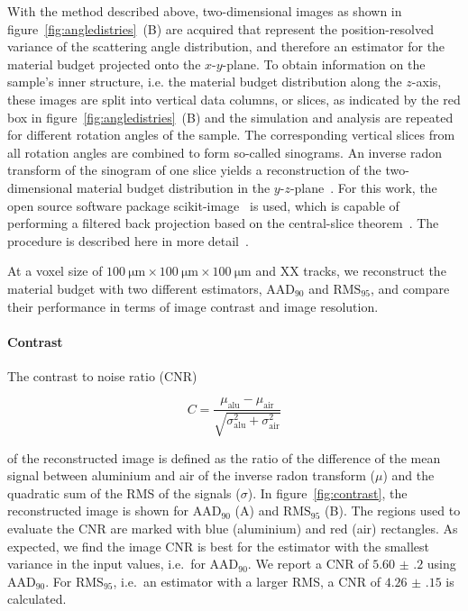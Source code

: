 \documentclass{PoS}
\newcommand{\rmsninetyfive}{\ensuremath{\textrm{RMS}_\textrm{95}}}
\newcommand{\aadninety}{\ensuremath{\textrm{AAD}_\textrm{90}}}
\begin{document}
With the method described above, two-dimensional images as shown in  figure~\ref{fig:angledistries}~(B) are acquired that represent the position-resolved variance of the scattering angle distribution,
 and therefore an estimator for the material budget projected onto the $x$-$y$-plane. 
To obtain information on the sample's inner structure, i.e. the material budget distribution along the $z$-axis, these images are split into vertical data columns, or slices,
as indicated by the red box in figure~\ref{fig:angledistries}~(B) and
 the simulation and analysis are repeated for different rotation angles of the sample.
  The corresponding vertical slices from all rotation angles are combined to form so-called sinograms.
An inverse radon transform of the sinogram of one slice yields a reconstruction of the two-dimensional material budget distribution in the $y$-$z$-plane~\cite{ref:deans2007radon}.
For this work, the open source software package scikit-image~\cite{ref:scikitWebpage,ref:scikitArticle} is used,
 which is capable of performing a filtered back projection based on the central-slice theorem~\cite{ref:deans2007radon}.
The procedure is described here in more detail~\cite{JansenAPLarxiv}. 

At a voxel size of $\SI{100}{\um} \times \SI{100}{\um} \times \SI{100}{\um}$ and XX tracks, we reconstruct the material budget with two different estimators, $\aadninety$ and $\rmsninetyfive$,
 and compare their performance in terms of image contrast and image resolution. 


\paragraph{Contrast}

The contrast to noise ratio (CNR) 

\begin{equation}
 C = \frac{\mu_{\textrm{alu}} - \mu_{\textrm{air}}}{\sqrt{\sigma_{\textrm{alu}}^{2} + \sigma_{\textrm{air}}^{2}}}
\end{equation}

\noindent
of the reconstructed image is defined as the ratio of the difference of the mean signal between aluminium and air of the inverse radon transform ($\mu$)
 and the quadratic sum of the RMS of the signals ($\sigma$). 
In figure~\ref{fig:contrast}, the reconstructed image is shown for $\aadninety$ (A) and $\rmsninetyfive$ (B).
The regions used to evaluate the CNR are marked with blue (aluminium) and red (air) rectangles.
As expected, we find the image CNR is best for the estimator with the smallest variance in the input values, i.e.\ for $\aadninety$. 
We report a CNR of $\num{5.60(20)}$ using $\aadninety$. 
For $\rmsninetyfive$, i.e.\ an estimator with a larger RMS, a CNR of $\num{4.26(15)}$ is calculated. 
\end{document}
